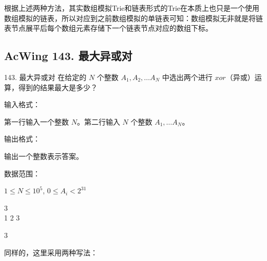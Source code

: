 \begin{information}
    根据上述两种方法，其实数组模拟Trie和链表形式的Trie在本质上也只是一个使用数组模拟的链表，所以对应到之前数组模拟的单链表可知：数组模拟无非就是将链表节点展平后每个数组元素存储下一个链表节点对应的数组下标。
\end{information}

\subsection{AcWing 143. 最大异或对}

\begin{titledbox}{143. 最大异或对}
在给定的 $N$ 个整数 $A_1, A_2, \dots A_N$ 中选出两个进行 $xor$（异或）运算，得到的结果最大是多少？

输入格式：

第一行输入一个整数 $N$。第二行输入 $N$ 个整数 $A_1, \dots A_N$。

输出格式：

输出一个整数表示答案。

数据范围：

$1 \le N \le 10^5$, $0 \le A_i < 2^{31}$

\begin{inputblock}
    3 \\
    1 2 3
\end{inputblock}
\begin{outputblock}
    3
\end{outputblock}
\end{titledbox}

同样的，这里采用两种写法：


